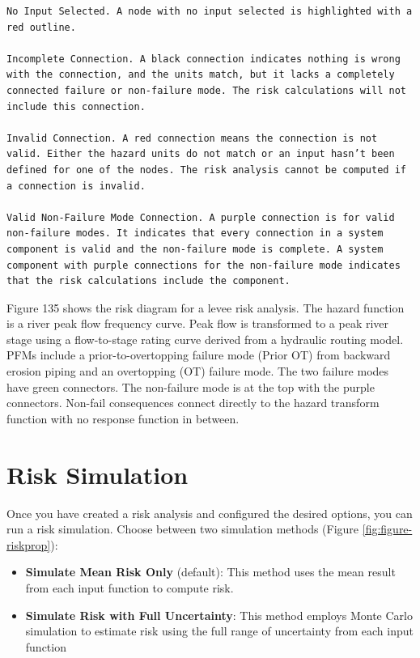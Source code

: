 \documentclass[
]{book}
\begin{document}
\begin{verbatim}
No Input Selected. A node with no input selected is highlighted with a red outline.

Incomplete Connection. A black connection indicates nothing is wrong with the connection, and the units match, but it lacks a completely connected failure or non-failure mode. The risk calculations will not include this connection.

Invalid Connection. A red connection means the connection is not valid. Either the hazard units do not match or an input hasn’t been defined for one of the nodes. The risk analysis cannot be computed if a connection is invalid.

Valid Non-Failure Mode Connection. A purple connection is for valid non-failure modes. It indicates that every connection in a system component is valid and the non-failure mode is complete. A system component with purple connections for the non-failure mode indicates that the risk calculations include the component.
\end{verbatim}

Figure 135 shows the risk diagram for a levee risk analysis. The hazard function is a river peak flow frequency curve. Peak flow is transformed to a peak river stage using a flow-to-stage rating curve derived from a hydraulic routing model. PFMs include a prior-to-overtopping failure mode (Prior OT) from backward erosion piping and an overtopping (OT) failure mode. The two failure modes have green connectors. The non-failure mode is at the top with the purple connectors. Non-fail consequences connect directly to the hazard transform function with no response function in between.

\hypertarget{risk-simulation}{%
\section{Risk Simulation}\label{risk-simulation}}

Once you have created a risk analysis and configured the desired options, you can run a risk simulation. Choose between two simulation methods (Figure \ref{fig:figure-riskprop}):

\begin{itemize}
\item
  \textbf{Simulate Mean Risk Only} (default): This method uses the mean result from each input function to compute risk.
\item
  \textbf{Simulate Risk with Full Uncertainty}: This method employs Monte Carlo simulation to estimate risk using the full range of uncertainty from each input function
\end{itemize}
\end{document}
